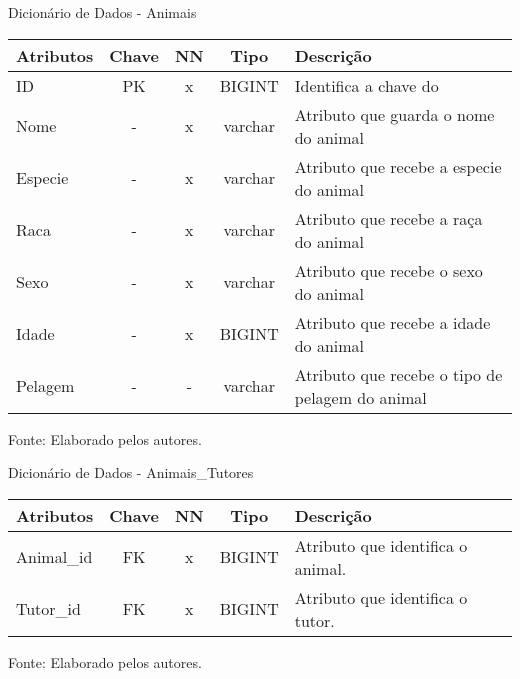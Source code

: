 \documentclass[
    12pt,               %
    openright,          %
    oneside,
    a4paper,            %
    BIBLATEX,           %
    TODO,               %
    english,            %
    brazil              %
    ]{ifsp-spo-inf-ctds}
\begin{document}
            \begin{center}
              \begin{quadro}[H]
              \centering
                  \caption{Dicionário de Dados - Animais}
                  \begin{tabulary}{1.0\textwidth}{|p{9em}|c|c|c|p{19em}|}
                \hline
                Atributos & Chave & NN & Tipo & Descrição\\
                \hline
                ID & PK & x & BIGINT & Identifica a chave do \\
                \hline
                Nome & - & x & varchar & Atributo que guarda o nome do animal\\
                \hline
                Especie & - & x & varchar & Atributo que recebe a especie do animal\\
                \hline
                Raca & - & x & varchar & Atributo que recebe a raça do animal \\
                \hline
                Sexo & - & x & varchar & Atributo que recebe o sexo do animal\\
                \hline
                Idade & - & x & BIGINT & Atributo que recebe a idade do animal\\
                \hline
                Pelagem & - & - & varchar & Atributo que recebe o tipo de pelagem do animal \\
                \hline
                \end{tabulary}

                  \label{qd: md-animal}
                  \centering
        {\footnotesize Fonte: Elaborado pelos autores.}
              \end{quadro}
            \end{center}

    \begin{center}
      \begin{quadro}[H]
      \centering
          \caption{Dicionário de Dados - Animais\_Tutores}
          \begin{tabulary}{1.0\textwidth}{|p{9em}|c|c|c|p{19em}|}
        \hline
        Atributos & Chave & NN & Tipo & Descrição\\
        \hline
        Animal\_id & FK & x & BIGINT & Atributo que identifica o animal. \\
        \hline
        Tutor\_id & FK & x & BIGINT & Atributo que identifica o tutor.\\
        \hline
        \end{tabulary}

          \label{qd: md-animaltutor}
          \centering
        {\footnotesize Fonte: Elaborado pelos autores.}
      \end{quadro}
    \end{center}
\end{document}
